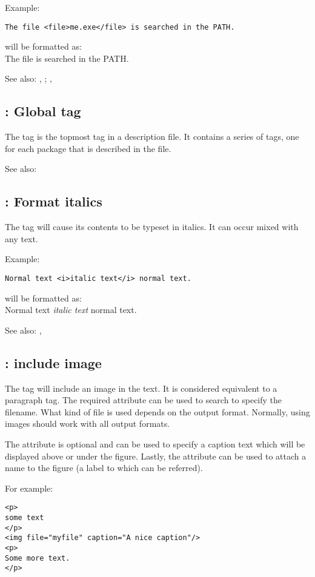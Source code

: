 Example:
\begin{verbatim}
The file <file>me.exe</file> is searched in the PATH.
\end{verbatim}
will be formatted as:\\
The file  is searched in the PATH.

See also: ,  ; ,  

\subsection{ : Global tag}
\label{tag:fpdocdescription}
The  tag is the topmost tag in a description file. It
contains a series of  tags, one for each package that is
described in the file.

See also: 

\subsection{ : Format italics}
\label{tag:i}
The  tag will cause its contents to be typeset in italics. It can
occur mixed with any text.

Example:
\begin{verbatim}
Normal text <i>italic text</i> normal text.
\end{verbatim}
will be formatted as:\\
Normal text \textit{italic text} normal text.

See also: , 

\subsection{ : include image}
\label{tag:img} 
The  tag will include an image in the text. It is considered
equivalent to a paragraph tag. The required attribute  can 
be used to search to specify the filename. What kind of file is used
depends on the output format. Normally, using  images should
work with all output formats.

The  attribute is optional and can be used to specify a
caption text which will be displayed above or under the figure. 
Lastly, the  attribute can be used to attach
a name to the figure (a label to which can be referred).

For example:
\begin{verbatim}
<p>
some text
</p>
<img file="myfile" caption="A nice caption"/>
<p>
Some more text.
</p>
\end{verbatim}

